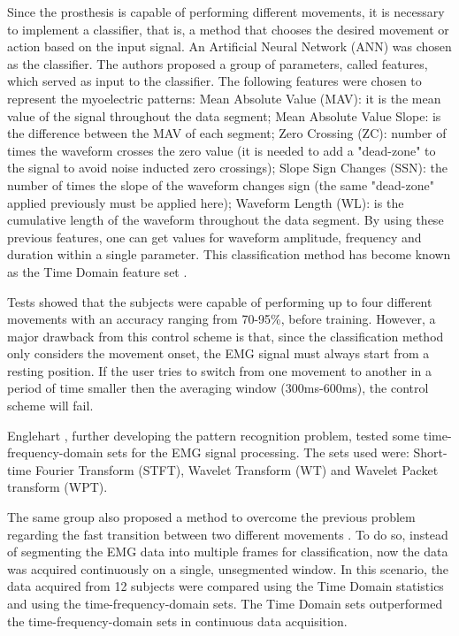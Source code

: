    Since the prosthesis is capable of performing different movements, it is necessary to implement a classifier, that is, a method that chooses the desired movement or action based on the input signal. An Artificial Neural Network (ANN) was chosen as the classifier. The authors proposed a group of parameters, called features, which served as input to the classifier. The following features were chosen to represent the myoelectric patterns: Mean Absolute Value (MAV): it is the mean value of the signal throughout the data segment; Mean Absolute Value Slope: is the difference between the MAV of each segment; Zero Crossing (ZC): number of times the waveform crosses the zero value (it is needed to add a "dead-zone" to the signal to avoid noise inducted zero crossings); Slope Sign Changes (SSN): the number of times the slope of the waveform changes sign (the same "dead-zone" applied previously must be applied here); Waveform Length (WL): is the cumulative length of the waveform throughout the data segment. By using these previous features, one can get values for waveform amplitude, frequency and duration within a single parameter. This classification method has become known as the Time Domain feature set \cite{Johnny2009}.
   
   Tests showed that the subjects were capable of performing up to four different movements with an accuracy ranging from 70-95\%, before training. However, a major drawback from this control scheme is that, since the classification method only considers the movement onset, the EMG signal must always start from a resting position. If the user tries to switch from one movement to another in a period of time smaller then the averaging window (300ms-600ms), the control scheme will fail.
   
   Englehart \cite{Englehart1999431}, further developing the pattern recognition problem, tested some time-frequency-domain sets  for the EMG signal processing. The sets used were: Short-time Fourier Transform (STFT), Wavelet Transform (WT) and Wavelet Packet transform (WPT).
   
   The same group also proposed a method  to overcome the previous problem regarding the fast transition between two different movements \cite{Englehart1206493}. To do so, instead of segmenting the EMG data into multiple frames for classification, now the data was acquired continuously on a single, unsegmented window. In this scenario, the data acquired from 12 subjects were compared using the Time Domain statistics and using the time-frequency-domain sets. The Time Domain sets outperformed the time-frequency-domain sets in continuous data acquisition.
   
